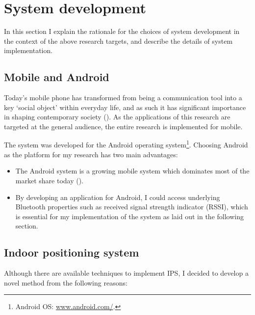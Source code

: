 \documentclass[a4paper,11pt]{article}
\begin{document}
\section{System development}

In this section I explain the rationale for the choices of system development in the context of the above research targets, and describe the details of system implementation.

\subsection{Mobile and Android}

Today's mobile phone has transformed from being a communication tool into a key `social object' within everyday life, and as such it has significant importance in shaping contemporary society (\cite{srivastava05}).
As the applications of this research are targeted at the general audience, the entire research is implemented for mobile.

The system was developed for the Android operating system\footnote{Android OS: \href{http://www.android.com/}{www.android.com/}.}.
Choosing Android as the platform for my research has two main advantages:
\begin{itemize}
	\item The Android system is a growing mobile system which dominates most of the market share today (\cite{web:idc}).
	\item By developing an application for Android, I could access underlying Bluetooth properties such as received signal strength indicator (RSSI), which is essential for my implementation of the system as laid out in the following section.
\end{itemize}

\subsection{Indoor positioning system}\label{methods:ips}

Although there are available techniques to implement IPS, I decided to develop a novel method from the following reasons:
\end{document}
